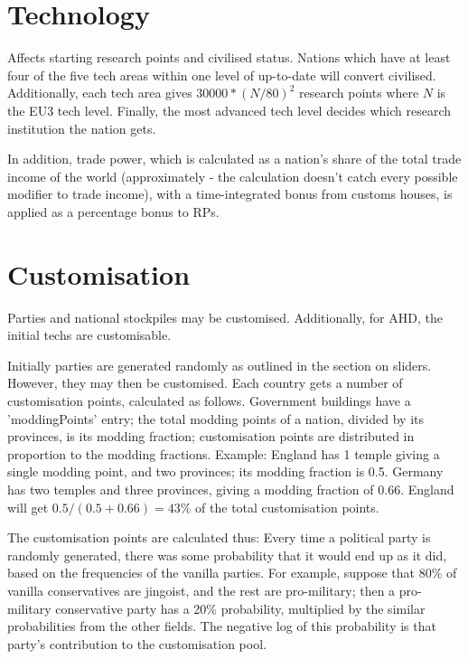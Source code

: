 \documentclass[12pt]{article}
\begin{document}
\section{Technology}

Affects starting research points and civilised status. Nations which
have at least four of the five tech areas within one level of
up-to-date will convert civilised. Additionally, each tech area gives
$30000*(N/80)^2$ research points where $N$ is the EU3 tech
level. Finally, the most advanced tech level decides which research
institution the nation gets. 

In addition, trade power, which is calculated as a nation's share of
the total trade income of the world (approximately - the calculation
doesn't catch every possible modifier to trade income), with a
time-integrated bonus from customs houses, is applied as a percentage
bonus to RPs. 

\section{Customisation}

Parties and national stockpiles may be customised. Additionally, for
AHD, the initial techs are customisable. 

Initially parties are generated randomly as outlined in the section on
sliders. However, they may then be customised. Each country gets a
number of customisation points, calculated as follows. Government
buildings have a 'moddingPoints' entry; the total modding points of
a nation, divided by its provinces, is its modding fraction; 
customisation points are distributed in proportion to the modding
fractions. Example: England has 1 temple giving a single modding
point, and two provinces; its modding fraction is 0.5. Germany has two
temples and three provinces, giving a modding fraction of
0.66. England will get $0.5/(0.5+0.66)=43\%$ of the total
customisation points. 

The customisation points are calculated thus: Every time a political
party is randomly generated, there was some probability that it would
end up as it did, based on the frequencies of the vanilla parties. For
example, suppose that 80\% of vanilla conservatives are jingoist, and
the rest are pro-military; then a pro-military conservative party has
a 20\% probability, multiplied by the similar probabilities from the
other fields. The negative log of this probability is that party's contribution
to the customisation pool. 
\end{document}
